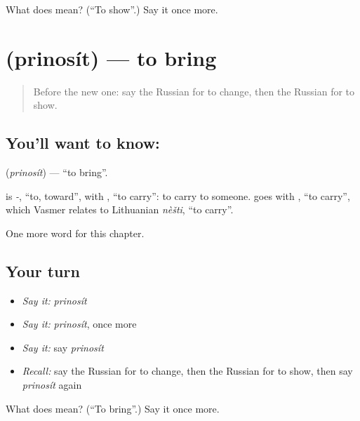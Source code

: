 \begin{tcolorbox}[breakable,colback=teal!4,colframe=teal!35!black,title={Before you move on}]
What does  mean? (\textquotedblleft{}To show\textquotedblright{}.) Say it once more.
\end{tcolorbox}
\section[\texorpdfstring{\ru{приносить} (prinosít)}{приносить (prinosít)}]{ (prinosít) — to bring}

\label{lesson:RU-C233-prinosit}



\begin{quote}
Before the new one: say the Russian for to change, then the Russian for to show.
\end{quote}

\subsection*{You'll want to know: }
\textbf{} (\emph{prinosít}) — \textquotedblleft{}to bring\textquotedblright{}.

\begin{cousinweb}
\textbf{} is \emph{-}, \textquotedblleft{}to, toward\textquotedblright{}, with \emph{}, \textquotedblleft{}to carry\textquotedblright{}: to carry to someone. \emph{} goes with \emph{}, \textquotedblleft{}to carry\textquotedblright{}, which Vasmer relates to Lithuanian \emph{nèšti}, \textquotedblleft{}to carry\textquotedblright{}.
\end{cousinweb}

\begin{grammarlens}[title={What you've built}]
One more word for this chapter.
\end{grammarlens}

\subsection*{Your turn}
\begin{itemize}
\raggedright
  \item \emph{Say it:} \emph{prinosít}
  \item \emph{Say it:} \emph{prinosít}, once more
  \item \emph{Say it:} say \emph{prinosít}
  \item \emph{Recall:} say the Russian for to change, then the Russian for to show, then say \emph{prinosít} again
\end{itemize}

\begin{tcolorbox}[breakable,colback=teal!4,colframe=teal!35!black,title={Before you move on}]
What does  mean? (\textquotedblleft{}To bring\textquotedblright{}.) Say it once more.
\end{tcolorbox}
